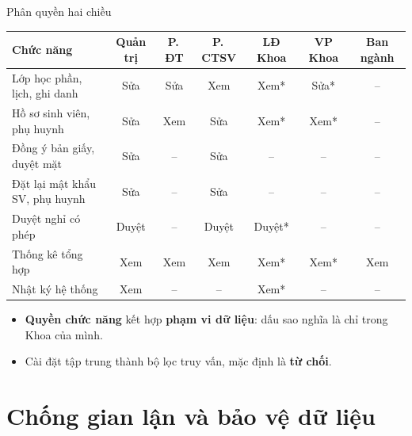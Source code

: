 \documentclass[aspectratio=169, 11pt]{beamer}
\begin{document}
\begin{frame}{Phân quyền hai chiều}
  \begin{center}
  \footnotesize
  \setlength{\tabcolsep}{4pt}
  \begin{tabular}{@{}lcccccc@{}}
    \toprule
    Chức năng & Quản trị & P.\,ĐT & P.\,CTSV & LĐ Khoa & VP Khoa & Ban ngành \\
    \midrule
    Lớp học phần, lịch, ghi danh & Sửa   & Sửa & Xem   & Xem*   & Sửa* & -- \\
    Hồ sơ sinh viên, phụ huynh   & Sửa   & Xem & Sửa   & Xem*   & Xem* & -- \\
    Đồng ý bản giấy, duyệt mặt   & Sửa   & --  & Sửa   & --     & --   & -- \\
    Đặt lại mật khẩu SV, phụ huynh & Sửa & --  & Sửa   & --     & --   & -- \\
    Duyệt nghỉ có phép           & Duyệt & --  & Duyệt & Duyệt* & --   & -- \\
    Thống kê tổng hợp            & Xem   & Xem & Xem   & Xem*   & Xem* & Xem \\
    Nhật ký hệ thống             & Xem   & --  & --    & Xem*   & --   & -- \\
    \bottomrule
  \end{tabular}
  \end{center}
  \vfill
  \begin{itemize}
    \item \textbf{Quyền chức năng} kết hợp \textbf{phạm vi dữ liệu}: dấu sao
          nghĩa là chỉ trong Khoa của mình.
    \item Cài đặt tập trung thành bộ lọc truy vấn, mặc định là \textbf{từ chối}.
  \end{itemize}
\end{frame}

\section{Chống gian lận và bảo vệ dữ liệu}
\end{document}
